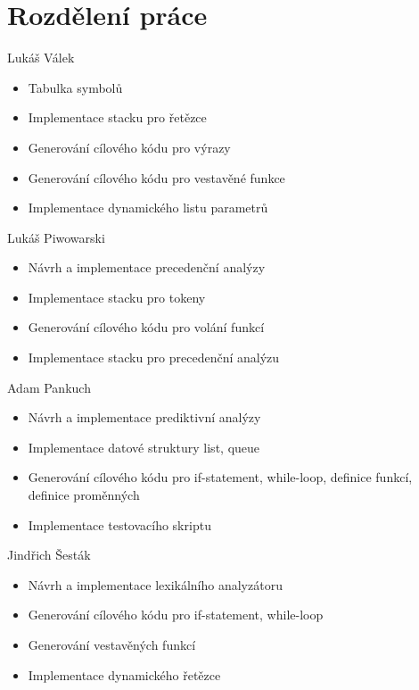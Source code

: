 \documentclass[11pt, a4paper]{article}
\begin{document}
\section{Rozdělení práce}
Lukáš Válek
\vspace{-0.6em}
\begin{itemize}
  \item{Tabulka symbolů}
  \vspace{-0.6em}
  \item{Implementace stacku pro řetězce}
  \vspace{-0.6em}
  \item{Generování cílového kódu pro výrazy}
  \vspace{-0.6em}
  \item{Generování cílového kódu pro vestavěné funkce}
  \vspace{-0.6em}
  \item{Implementace dynamického listu parametrů}
\end{itemize}
Lukáš Piwowarski
\vspace{-0.6em}
\begin{itemize}
  \item{Návrh a implementace precedenční analýzy}
  \vspace{-0.6em}
  \item{Implementace stacku pro tokeny}
  \vspace{-0.6em}
  \item{Generování cílového kódu pro volání funkcí}
  \vspace{-0.6em}
  \item{Implementace stacku pro precedenční analýzu}
\end{itemize}
Adam Pankuch
\vspace{-0.6em}
\begin{itemize}
  \item{Návrh a implementace prediktivní analýzy}
  \vspace{-0.6em}
  \item{Implementace datové struktury list, queue}
  \vspace{-0.6em}
  \item{Generování cílového kódu pro if-statement, while-loop, definice funkcí, definice proměnných}
  \vspace{-0.6em}
  \item{Implementace testovacího skriptu}
\end{itemize}
Jindřich Šesták
\vspace{-0.6em}
\begin{itemize}
  \item{Návrh a implementace lexikálního analyzátoru}
  \vspace{-0.6em}
  \item{Generování cílového kódu pro if-statement, while-loop}
  \vspace{-0.6em}
  \item{Generování vestavěných funkcí}
  \vspace{-0.6em}
  \item{Implementace dynamického řetězce}
\end{itemize}
\end{document}
